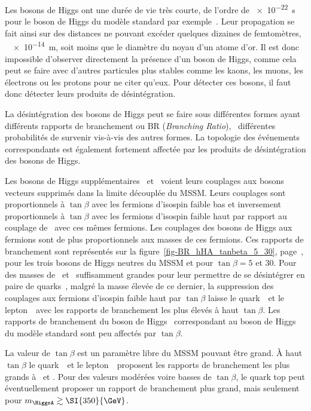 Les bosons de Higgs ont une durée de vie très courte, de l'ordre de \SI{e-22}{\second} pour le boson de Higgs du modèle standard par exemple~\cite{PDG_booklet_2018}.
Leur propagation se fait ainsi sur des distances ne pouvant excéder quelques dizaines de femtomètres, \ie\ \SI{e-14}{\meter}, soit moins que le diamètre du noyau d'un atome d'or.
Il est donc impossible d'observer directement la présence d'un boson de Higgs, comme cela peut se faire avec d'autres particules plus stables comme les kaons, les muons, les électrons ou les protons pour ne citer qu'eux.
Pour détecter ces bosons, il faut donc détecter leurs produits de désintégration.
\par La désintégration des bosons de Higgs peut se faire sous différentes formes ayant différents rapports de branchement ou BR (\emph{Branching Ratio}), \ie\ différentes probabilités de survenir vis-à-vis des autres formes.
La topologie des événements correspondants est également fortement affectée par les produits de désintégration des bosons de Higgs.
\par Les bosons de Higgs supplémentaires \Higgs\ et \HiggsA\ voient leurs couplages aux bosons vecteurs supprimés dans la limite découplée du MSSM.
Leurs couplages sont proportionnels à $\tan\beta$ avec les fermions d'isospin faible bas et inversement proportionnels à $\tan\beta$ avec les fermions d'isospin faible haut par rapport au couplage de \higgs\ avec ces mêmes fermions.
Les couplages des bosons de Higgs aux fermions sont de plus proportionnels aux masses de ces fermions.
Ces rapports de branchement sont représentés sur la figure~\ref{fig-BR_hHA_tanbeta_5_30}, page~\pageref{fig-BR_hHA_tanbeta_5_30}, pour les trois bosons de Higgs neutres du MSSM et pour $\tan\beta=5$ et $30$.
Pour des masses de \Higgs\ et \HiggsA\ suffisamment grandes pour leur permettre de se désintégrer en paire de quarks~\quarkt, malgré la masse élevée de ce dernier, la suppression des couplages aux fermions d'isospin faible haut par $\tan\beta$ laisse le quark~\quarkb\ et le lepton~\tau\ avec les rapports de branchement les plus élevés à haut $\tan\beta$.
Les rapports de branchement du boson de Higgs \higgs\ correspondant au boson de Higgs du modèle standard sont peu affectés par $\tan\beta$.
\par La valeur de $\tan\beta$ est un paramètre libre du MSSM pouvant être grand.
À haut $\tan\beta$ le quark~\quarkb\ et le lepton~\tau\ proposent les rapports de branchement les plus grands à \Higgs\ et \HiggsA.
Pour des valeurs modérées voire basses de $\tan\beta$, le quark top peut éventuellement proposer un rapport de branchement plus grand, mais seulement pour $m_{\HiggsA}\gtrsim\SI{350}{\GeV}$.
